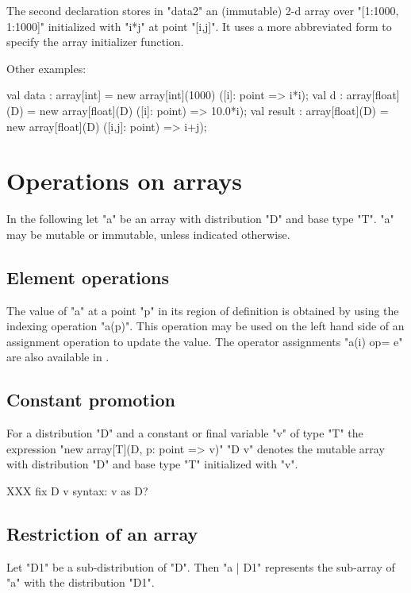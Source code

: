 The second declaration stores in \xcd"data2" an (immutable)
2-d array over \xcd"[1:1000, 1:1000]" initialized with \xcd"i*j"
at point \xcd"[i,j]". It uses a more abbreviated form to specify 
the array initializer function.

Other examples:
\begin{xten}
val data : array[int]
    = new array[int](1000)
        ([i]: point => i*i);
val d : array[float](D)
   = new array[float](D) ([i]: point) => 10.0*i);
val result : array[float](D)
   = new array[float](D) ([i,j]: point) => i+j);
\end{xten}

\section{Operations on arrays}
In the following let \xcd"a" be an array with distribution \xcd"D" and
base type \xcd"T". \xcd"a" may be mutable or immutable, unless
indicated otherwise.

\subsection{Element operations}
The value of \xcd"a" at a point \xcd"p" in its region of definition is
obtained by using the indexing operation \xcd"a(p)". This operation
may be used on the left hand side of an assignment operation to update
the value. The operator assignments \xcd"a(i) op= e" are also available
in \Xten{}.

\subsection{Constant promotion}\label{ConstantArray}

For a distribution \xcd"D" and a constant or final variable \xcd"v" of
type \xcd"T" the expression \xcd"new array[T](D, p: point => v)"
\xcd"D v" denotes the mutable array with
distribution \xcd"D" and base type \xcd"T" initialized with \xcd"v".

XXX fix D v syntax: v as D?

\subsection{Restriction of an array}

Let \xcd"D1" be a sub-distribution of \xcd"D". Then \xcd"a | D1"
represents the sub-array of \xcd"a" with the distribution \xcd"D1".

